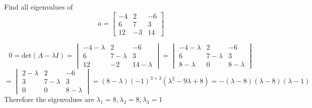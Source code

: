 \documentclass[english, 12pt]{article}
\begin{document}
\begin{exmp}
Find all eigenvalues of
\[a = \begin{bmatrix} -4 & 2 & -6 \\ 6 & 7 & 3 \\ 12 & -3 & 14 \end{bmatrix}\]
\begin{sol}
\[0 = \text{det}(A - \lambda I) = \begin{vmatrix}-4 - \lambda & 2 & - 6 \\ 6 & 7 - \lambda & 3 \\ 12 & -2 & 14 - \lambda \end{vmatrix} = \begin{vmatrix} -4 - \lambda & 2 & -6 \\ 6 & 7 - \lambda & 3 \\ 8 - \lambda & 0 & 8 - \lambda \end{vmatrix}\]
\[ = \begin{vmatrix} 2 - \lambda & 2 & -6 \\ 3 & 7 - \lambda & 3 \\ 0 & 0 & 8 - \lambda \end{vmatrix} =(8-\lambda)(-1)^{3+3} (\lambda^2 - 9 \lambda + 8) = -(\lambda - 8)(\lambda - 8)(\lambda - 1)\]
Therefore the eigenvalues are $\lambda_1 = 8, \lambda_2 = 8, \lambda_3 = 1$
\end{sol}
\end{exmp}
\end{document}
